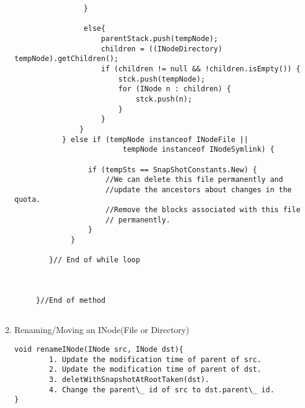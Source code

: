 \begin{enumerate}
\begin{verbatim}
                }
                
                else{
                    parentStack.push(tempNode);            
                    children = ((INodeDirectory) tempNode).getChildren();
                    if (children != null && !children.isEmpty()) {
                        stck.push(tempNode);
                        for (INode n : children) {
                            stck.push(n);
                        }
                    } 
               }
           } else if (tempNode instanceof INodeFile ||
                         tempNode instanceof INodeSymlink) {
                         
                 if (tempSts == SnapShotConstants.New) {
                     //We can delete this file permanently and 
                     //update the ancestors about changes in the quota.
                     //Remove the blocks associated with this file
                     // permanently.
                 }
             } 
             
        }// End of while loop
        
		      
        
     }//End of method      
            
\end{verbatim}


\item Renaming/Moving an INode(File or Directory)
\begin{verbatim}
void renameINode(INode src, INode dst){
        1. Update the modification time of parent of src.
        2. Update the modification time of parent of dst.
        3. deletWithSnapshotAtRootTaken(dst).
        4. Change the parent\_ id of src to dst.parent\_ id.
}
\end{verbatim}

\end{enumerate}



